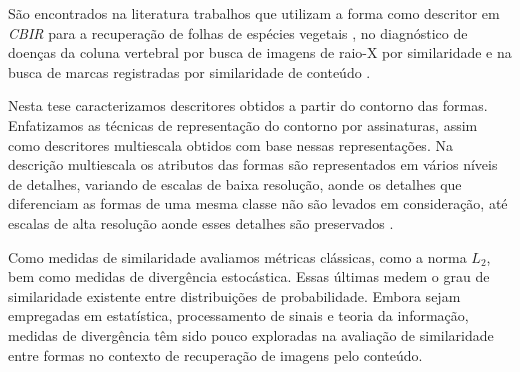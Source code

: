 São encontrados na literatura trabalhos que utilizam a forma como descritor em \emph{CBIR} para a recuperação de folhas de espécies vegetais \cite{Fotopoulou:2013, Nam2008245, Wang:2000}, no diagnóstico de doenças da coluna vertebral por busca de imagens de raio-X por similaridade \cite{Lee:2009} e na busca de marcas registradas por similaridade de conteúdo \cite{MohdAnuar2013105,Qi20102017}.

\begin{comment}
A demanda por novas maneiras de gerenciar e buscar informação multimidia surgiu com a popularização da internet, com a maior disponibilidade de dispositivos de captura de imagens e com a diminuição dos custos dos meios de armazenamento; aspectos esses que contribuíram para um volume crescente de imagens digitais disponibilizadas para as mais diversas finalidades.

Neste contexto, uma nova linha de pesquisa de sistemas de busca de informação desponta, denominada de recuperação de imagens pelo conteúdo ou, do inglês, \foreignlanguage{english}{\emph{Content-Based Image Retrieval}} (\emph{CBIR}). 

Neste trabalho aplicamos algumas medidas da teoria da informação em reconhecimento de formas. Enfatizamos as técnicas de representação das formas através do seus contornos, assim como descritores multiescala obtidos a partir dessas representações. Assim, propomos um novo descritor mutiscala de formas baseado em medidas de entropia. Investigamos também a aplicação das medidas de divergência na avaliação da similaridade entre formas. Divergentes são funcionais que medem a distância existente entre modelos estatísticos que são utilizadas em processamento de sinais e reconhecimento de padrões \cite{Basseville1989349}.   
\end{comment}

Nesta tese caracterizamos descritores obtidos a partir do contorno das formas.  Enfatizamos as técnicas de representação do contorno por assinaturas, assim como descritores multiescala obtidos com base nessas representações. Na descrição multiescala os atributos das formas são representados em vários níveis de detalhes, variando de escalas de baixa resolução, aonde os detalhes que diferenciam as formas de uma mesma classe não são levados em consideração, até escalas de alta resolução aonde esses detalhes são preservados \cite{Ullman:1996}.
 
Como medidas de similaridade avaliamos métricas clássicas, como a norma $L_2$, bem como medidas de divergência estocástica. Essas últimas medem o grau de similaridade existente entre distribuições de probabilidade. Embora sejam empregadas em estatística, processamento de sinais e teoria da informação, medidas de divergência têm sido pouco exploradas na avaliação de similaridade entre formas no contexto de recuperação de imagens pelo conteúdo.  

